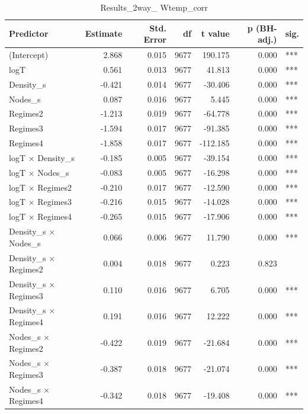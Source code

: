 \begin{table}[ht]
\centering
\begin{tabular}{lrrrrrl}
  \hline
Predictor & Estimate & Std. Error & df & t value & p (BH-adj.) & sig. \\ 
  \hline
(Intercept) & 2.868 & 0.015 & 9677 & 190.175 & 0.000 & *** \\ 
  logT & 0.561 & 0.013 & 9677 & 41.813 & 0.000 & *** \\ 
  Density\_s & -0.421 & 0.014 & 9677 & -30.406 & 0.000 & *** \\ 
  Nodes\_s & 0.087 & 0.016 & 9677 & 5.445 & 0.000 & *** \\ 
  Regimes2 & -1.213 & 0.019 & 9677 & -64.778 & 0.000 & *** \\ 
  Regimes3 & -1.594 & 0.017 & 9677 & -91.385 & 0.000 & *** \\ 
  Regimes4 & -1.858 & 0.017 & 9677 & -112.185 & 0.000 & *** \\ 
  logT × Density\_s & -0.185 & 0.005 & 9677 & -39.154 & 0.000 & *** \\ 
  logT × Nodes\_s & -0.083 & 0.005 & 9677 & -16.298 & 0.000 & *** \\ 
  logT × Regimes2 & -0.210 & 0.017 & 9677 & -12.590 & 0.000 & *** \\ 
  logT × Regimes3 & -0.216 & 0.015 & 9677 & -14.028 & 0.000 & *** \\ 
  logT × Regimes4 & -0.265 & 0.015 & 9677 & -17.906 & 0.000 & *** \\ 
  Density\_s × Nodes\_s & 0.066 & 0.006 & 9677 & 11.790 & 0.000 & *** \\ 
  Density\_s × Regimes2 & 0.004 & 0.018 & 9677 & 0.223 & 0.823 &  \\ 
  Density\_s × Regimes3 & 0.110 & 0.016 & 9677 & 6.705 & 0.000 & *** \\ 
  Density\_s × Regimes4 & 0.191 & 0.016 & 9677 & 12.222 & 0.000 & *** \\ 
  Nodes\_s × Regimes2 & -0.422 & 0.019 & 9677 & -21.684 & 0.000 & *** \\ 
  Nodes\_s × Regimes3 & -0.387 & 0.018 & 9677 & -21.074 & 0.000 & *** \\ 
  Nodes\_s × Regimes4 & -0.342 & 0.018 & 9677 & -19.408 & 0.000 & *** \\ 
   \hline
\end{tabular}
\caption{Results_2way_ Wtemp_corr} 
\end{table}
